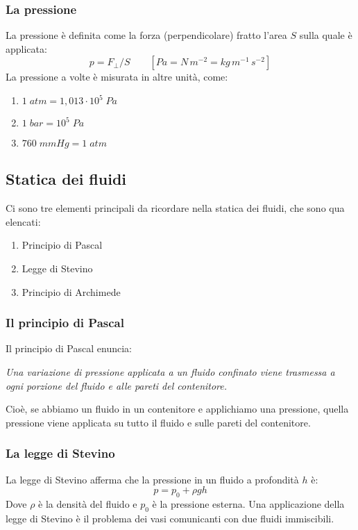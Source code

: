 \documentclass{article}
\begin{document}
\subsubsection{La pressione}
La pressione è definita come la forza (perpendicolare) fratto l'area $S$ sulla quale è applicata:
\begin{equation}
    p=F_{\perp}/S \qquad [Pa = N \,m^{-2} = kg\,m^{-1}\,s^{-2}]
\end{equation}
La pressione a volte è misurata in altre unità, come:
\begin{enumerate}
    \item $1 \;atm = 1,013 \cdot 10^5 \;Pa$
    \item $1 \;bar = 10^5 \;Pa$
    \item $760 \;mmHg = 1 \;atm$
\end{enumerate}

\subsection{Statica dei fluidi}
Ci sono tre elementi principali da ricordare nella statica dei fluidi, che sono qua elencati:
\begin{enumerate}
    \item Principio di Pascal
    \item Legge di Stevino
    \item Principio di Archimede
\end{enumerate}

\subsubsection{Il principio di Pascal}
Il principio di Pascal enuncia:

\vspace{3mm}
\textit{Una variazione di pressione applicata a un fluido confinato
viene trasmessa a ogni porzione del fluido e alle pareti del contenitore.}
\vspace{3mm}

Cioè, se abbiamo un fluido in un contenitore e applichiamo una pressione, quella pressione viene applicata su tutto il fluido e sulle pareti del contenitore.

\subsubsection{La legge di Stevino}
La legge di Stevino afferma che la pressione in un fluido a profondità $h$ è:
\begin{equation}
    p=p_0+\rho g h
\end{equation}
Dove $\rho$ è la densità del fluido e $p_0$ è la pressione esterna.
Una applicazione della legge di Stevino è il problema dei vasi comunicanti con due fluidi immiscibili.
\end{document}
